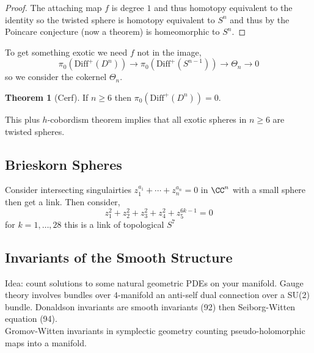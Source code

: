 \documentclass[12pt]{extarticle}
\theoremstyle{definition}
\newtheorem{theorem}{Theorem}[section]
\begin{document}
\begin{proof}
The attaching map $f$ is degree $1$ and thus homotopy equivalent to the identity so the twisted sphere is homotopy equivalent to $S^n$ and thus by the Poincare conjecture (now a theorem) is homeomorphic to $S^n$.
\end{proof}

To get something exotic we need $f$ not in the image,
\[ \pi_0(\mathrm{Diff}^+(D^n)) \to \pi_0(\mathrm{Diff}^+(S^{n-1})) \to \Theta_n \to 0 \]
so we consider the cokernel $\Theta_n$. 

\begin{theorem}[Cerf]
If $n \ge 6$ then $\pi_0(\mathrm{Diff}^+(D^n)) = 0$. 
\end{theorem}

This plus $h$-cobordism theorem implies that all exotic spheres in $n \ge 6$ are twisted spheres. 

\subsection{Brieskorn Spheres}

Consider intersecting singulairties $z_1^{a_1} + \cdots + z_n^{a_n} = 0$ in $\CC^n$ with a small sphere then get a link. Then consider,
\[ z_1^2 + z_2^2 + z_3^2 + z_4^2 + z_5^{6k-1} = 0 \]
for $k = 1, \dots, 28$ this is a link of topological $S^7$

\subsection{Invariants of the Smooth Structure}

Idea: count solutions to some natural geometric PDEs on your manifold. Gauge theory involves bundles over $4$-manifold an anti-self dual connection over a SU(2) bundle. Donaldson invariants are smooth invariants (92) then Seiborg-Witten equation (94).
\bigskip\\
Gromov-Witten invariants in symplectic geometry counting pseudo-holomorphic maps into a manifold. 
  
\end{document}
